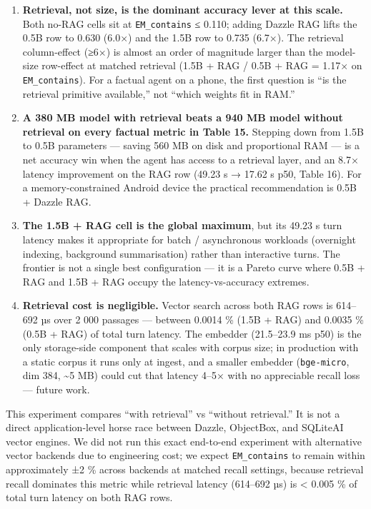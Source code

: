 \begin{enumerate}
\def\labelenumi{\arabic{enumi}.}
\tightlist
\item
  \textbf{Retrieval, not size, is the dominant accuracy lever at this scale.}
  Both no-RAG cells sit at \texttt{EM\_contains} ≤ 0.110; adding Dazzle RAG
  lifts the 0.5B row to 0.630 (6.0×) and the 1.5B row to 0.735 (6.7×). The
  retrieval column-effect (≥6×) is almost an order of magnitude larger than the
  model-size row-effect at matched retrieval (1.5B + RAG / 0.5B + RAG = 1.17× on
  \texttt{EM\_contains}). For a factual agent on a phone, the first question is
  ``is the retrieval primitive available,'' not ``which weights fit in RAM.''
\item
  \textbf{A 380 MB model with retrieval beats a 940 MB model without retrieval
  on every factual metric in Table 15.} Stepping down from 1.5B to 0.5B
  parameters --- saving 560 MB on disk and proportional RAM --- is a net
  accuracy win when the agent has access to a retrieval layer, and an 8.7×
  latency improvement on the RAG row (49.23 s → 17.62 s p50, Table 16). For a
  memory-constrained Android device the practical recommendation is 0.5B +
  Dazzle RAG.
\item
  \textbf{The 1.5B + RAG cell is the global maximum}, but its 49.23 s turn
  latency makes it appropriate for batch / asynchronous workloads (overnight
  indexing, background summarisation) rather than interactive turns. The
  frontier is not a single best configuration --- it is a Pareto curve where
  0.5B + RAG and 1.5B + RAG occupy the latency-vs-accuracy extremes.
\item
  \textbf{Retrieval cost is negligible.} Vector search across both RAG rows is
  614--692 µs over 2 000 passages --- between 0.0014 \% (1.5B + RAG) and 0.0035
  \% (0.5B + RAG) of total turn latency. The embedder (21.5--23.9 ms p50) is the
  only storage-side component that scales with corpus size; in production with a
  static corpus it runs only at ingest, and a smaller embedder
  (\texttt{bge-micro}, dim 384, \textasciitilde5 MB) could cut that latency
  4--5× with no appreciable recall loss --- future work.
\end{enumerate}

This experiment compares ``with retrieval'' vs ``without retrieval.'' It is not
a direct application-level horse race between Dazzle, ObjectBox, and SQLiteAI
vector engines. We did not run this exact end-to-end experiment with alternative
vector backends due to engineering cost; we expect \texttt{EM\_contains} to
remain within approximately ±2 \% across backends at matched recall settings,
because retrieval recall dominates this metric while retrieval latency (614--692
µs) is \textless{} 0.005 \% of total turn latency on both RAG rows.

